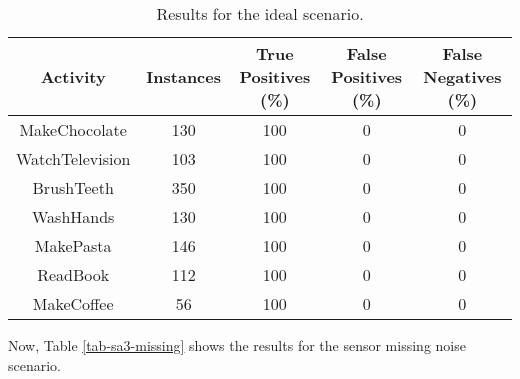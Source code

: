 \begin{table}[htbp]\scriptsize
  \begin{center}
        \begin{tabular}{ccccc}
            \hline            
            \textbf{Activity} & \textbf{Instances} & \textbf{True Positives (\%)} &  \textbf{False Positives (\%)} & \textbf{False Negatives (\%)}\\             
            \hline
            MakeChocolate   & 130 & 100 & 0 & 0 \\
	    WatchTelevision & 103 & 100 & 0 & 0 \\
	    BrushTeeth      & 350 & 100 & 0 & 0 \\
	    WashHands       & 130 & 100 & 0 & 0 \\
	    MakePasta       & 146 & 100 & 0 & 0 \\
	    ReadBook        & 112 & 100 & 0 & 0 \\
	    MakeCoffee      & 56 & 100 & 0 & 0 \\
            \hline
        \end{tabular}                
        \caption{Results for the ideal scenario.}
        \label{tab-sa3-ideal}
    \end{center}
\end{table}

Now, Table \ref{tab-sa3-missing} shows the results for the sensor missing noise scenario.

